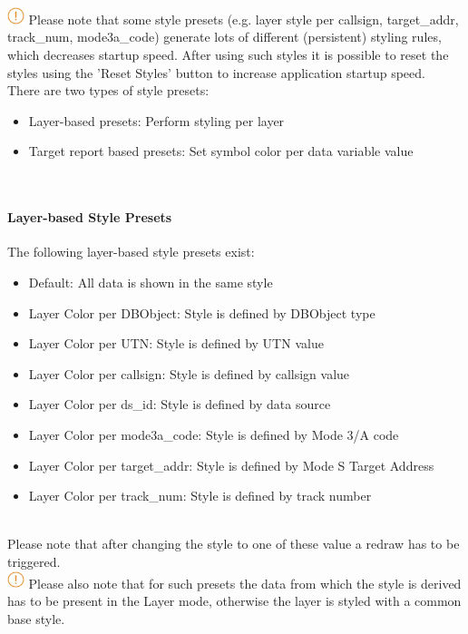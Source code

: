 \includegraphics[width=0.5cm]{../../data/icons/hint.png} Please note that some style presets (e.g. layer style per callsign, target\_addr, track\_num, mode3a\_code) generate lots of different (persistent) styling rules, which decreases startup speed. After using such styles it is possible to reset the styles using the 'Reset Styles' button to increase application startup speed. \\

There are two types of style presets:
\begin{itemize}
 \item Layer-based presets: Perform styling per layer
 \item Target report based presets: Set symbol color per data variable value
\end{itemize}
\  \\

\paragraph{Layer-based Style Presets}
The following layer-based style presets exist:
\begin{itemize}
 \item Default: All data is shown in the same style
 \item Layer Color per DBObject: Style is defined by DBObject type
 \item Layer Color per UTN: Style is defined by UTN value
 \item Layer Color per callsign: Style is defined by callsign value
 \item Layer Color per ds\_id: Style is defined by data source
 \item Layer Color per mode3a\_code: Style is defined by Mode 3/A code
 \item Layer Color per target\_addr: Style is defined by Mode S Target Address
 \item Layer Color per track\_num: Style is defined by track number
\end{itemize}
\  \\

Please note that after changing the style to one of these value a redraw has to be triggered. \\

\includegraphics[width=0.5cm]{../../data/icons/hint.png} Please also note that for such presets the data from which the style is derived has to be present in the Layer mode, otherwise the layer is styled with a common base style.

